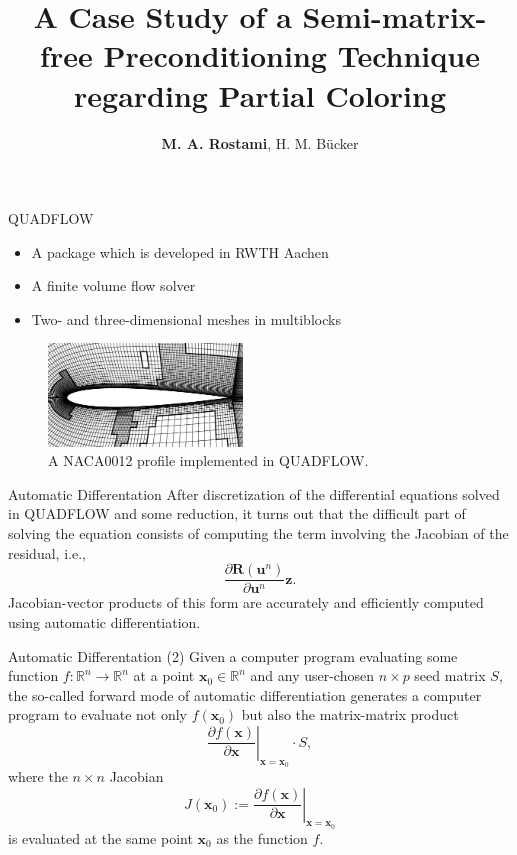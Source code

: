 \documentclass{beamer}
\title[]
{A Case Study of a Semi-matrix-free Preconditioning Technique regarding Partial Coloring}
\author[\textbf{Rostami}, B{\"u}cker]{{\bf M. A. Rostami}, H. M. B{\"u}cker}
\institute[FSU Jena]{
  Chair of Advanced Computing\\
  Friedrich Schiller University Jena, Germany\\[1ex]
  \texttt{a.rostami@uni-jena.de}
}
\newcommand{\vek}[1]{{\ensuremath{\mathbf #1}}}
\newcommand{\R}{\ensuremath{\field{R}}}
\newcommand{\field}[1]{\mathbb{#1}}
\begin{document}
\begin{frame}[plain]
  \titlepage
\end{frame}

\begin{frame}{QUADFLOW}
\begin{itemize}
\item A package which is developed in RWTH Aachen
\item A finite volume flow solver
\item Two- and three-dimensional meshes in multiblocks
\end{itemize}
\begin{figure}[h]
\centering
\includegraphics[width=0.46\textwidth]{profile}
\caption{A NACA0012 profile implemented in
QUADFLOW.}
\label{f:profile}
\end{figure}
\end{frame}

\begin{frame}{Automatic Differentation}
After discretization of the differential equations solved in 
QUADFLOW and some reduction, it turns out that the
difficult part of solving the equation consists of computing the term involving the
Jacobian of the residual, i.e.,
\begin{equation*}
\frac{\partial \vek{R}(\vek{u}^n)}{\partial \vek{u}^n} \vek{z}.
\end{equation*}
Jacobian-vector products of this form are accurately and efficiently computed using
automatic differentiation.
\end{frame}

\begin{frame}{Automatic Differentation (2)}
Given a computer program evaluating some function $f: \R^n \rightarrow
\R^n$ at a point $\vek{x}_0\in \R^n$ and any user-chosen $n \times p$ seed matrix $S$,
the so-called forward mode of automatic differentiation generates a computer program to
evaluate not only $f(\vek{x}_0)$ but also the matrix-matrix product
$$
\left.\frac{\partial f(\vek{x})}{\partial \vek{x}}\right|_{\vek{x}=\vek{x}_0} \cdot S,
$$
where the $n \times n$ Jacobian
$$
J(\vek{x}_0) := \left.\frac{\partial f(\vek{x})}{\partial \vek{x}}\right|_{\vek{x}=\vek{x}_0}
$$
is evaluated at the same point $\vek{x}_0$ as the function $f$.
\end{frame}
\end{document}
